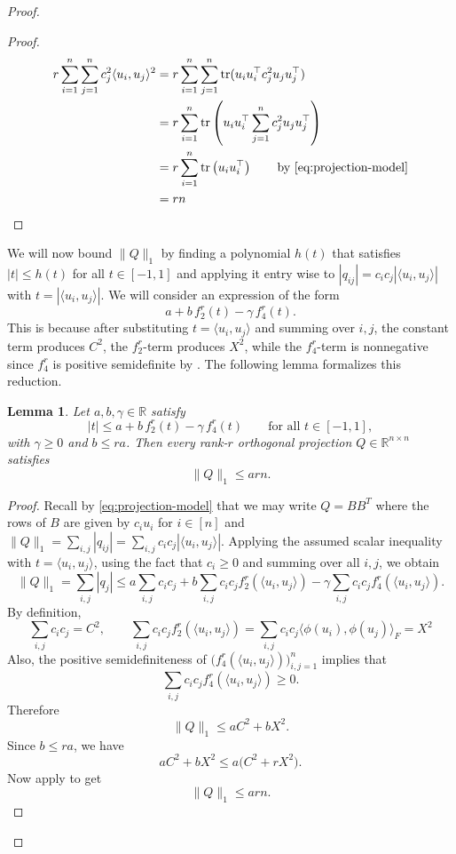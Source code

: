 \documentclass[10pt,a4paper]{amsart}
\newtheorem{lemma}{Lemma}
\newcommand{\R}{\mathbb{R}}
\newcommand{\abs}[1]{\lvert #1\rvert}
\newcommand{\froinner}[2]{\langle #1,#2\rangle_{\!F}}
\newcommand{\inner}[2]{\langle #1,#2\rangle}
\DeclareMathOperator{\tr}{tr}
\begin{document}
\begin{proof}
\begin{proof}
\begin{align*}
r \sum_{i=1}^n \sum_{j=1}^n c_j^2 \inner{u_i}{u_j}^2
&= r \sum_{i=1}^n \sum_{j=1}^n \tr(u_i u_i^\top c_j^2 u_j u_j^\top)\\
&= r \sum_{i=1}^n  \tr\left(u_i u_i^\top \sum_{j=1}^n c_j^2 u_j u_j^\top\right)\\
&= r \sum_{i=1}^n  \tr\left(u_i u_i^\top\right) \text{\qquad by \Cref{eq:projection-model}}\\
&= r n
\end{align*}
\end{proof}



We will now bound \(\|Q\|_1\) by finding a polynomial $h(t)$ that satisfies $|t| \leq h(t)$ for all $t \in [-1,1]$ and applying it entry wise to $|q_{ij}| = c_i c_j |\inner{u_i}{u_j}|$ with $t = |\inner{u_i}{u_j}|$. We will consider an expression of the form
\[
a+b\,f_2^r(t)-\gamma\,f_4^r(t).
\]
This is because after substituting \(t=\inner{u_i}{u_j}\) and summing over \(i,j\), the constant term produces $C^2$, the \(f_2^r\)-term produces \(X^2\), while the \(f_4^r\)-term is nonnegative since $f_4^r$ is positive semidefinite by . The following lemma formalizes this reduction.

\begin{lemma}\label{lem:abstract-majorant}
Let \(a,b,\gamma\in\R\) satisfy
\[
\abs{t}\le a+b\,f_2^r(t)-\gamma\,f_4^r(t)
\qquad\text{for all } t\in[-1,1],
\]
with \(\gamma\ge 0\) and \(b\le ra\). Then every rank-\(r\) orthogonal projection \(Q\in\R^{n\times n}\) satisfies
\[
\|Q\|_1\le arn.
\]
\end{lemma}

\begin{proof}
Recall by \eqref{eq:projection-model} that we may write $Q = BB^T$ where the rows of $B$ are given by $c_i u_i$ for $i \in [n]$ and $\|Q\|_1 = \sum_{i,j} |q_{ij}| = \sum_{i,j} c_i c_j |\inner{u_i}{u_j}|$. Applying the assumed scalar inequality with \(t=\inner{u_i}{u_j}\), using the fact that $c_i \geq 0$ and summing over all \(i,j\), we obtain
\[
\|Q\|_1 = \sum_{i,j} |q_j|
\le a\sum_{i,j} c_i c_j
+b\sum_{i,j} c_i c_j f_2^r(\inner{u_i}{u_j})
-\gamma\sum_{i,j} c_i c_j f_4^r(\inner{u_i}{u_j}).
\]
By definition,
\[
\sum_{i,j} c_i c_j=C^2,
\qquad
\sum_{i,j} c_i c_j f_2^r(\inner{u_i}{u_j}) = \sum_{i,j} c_i c_j \froinner{\phi(u_i)}{\phi(u_j)} = X^2
\]
Also, the positive semidefiniteness of \(\bigl(f_4^r(\inner{u_i}{u_j})\bigr)_{i,j=1}^n\) implies that
\[
\sum_{i,j} c_i c_j f_4^r(\inner{u_i}{u_j})\ge 0.
\]
Therefore
\[
\|Q\|_1\le aC^2+bX^2.
\]
Since \(b\le ra\), we have
\[
aC^2+bX^2\le a\bigl(C^2+rX^2\bigr).
\]
Now apply  to get
\[
\|Q\|_1\le arn.
\]
\end{proof}


\end{proof}
\end{document}
